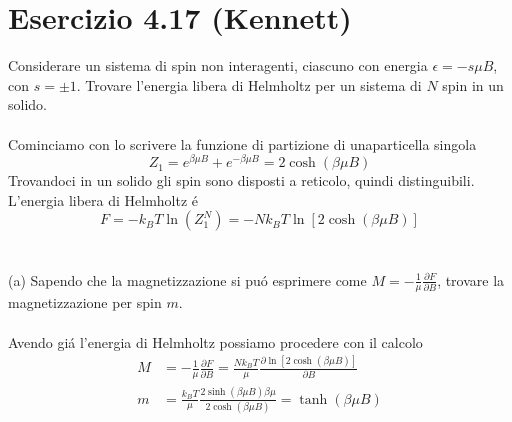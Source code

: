 \documentclass[a4paper]{article}
\begin{document}
    \section*{Esercizio 4.17 (Kennett)}
        Considerare un sistema di spin non interagenti, ciascuno con energia $\epsilon=-s\mu B$, con $s=\pm 1$.
        Trovare l'energia libera di Helmholtz per un sistema di $N$ spin in un solido.
        \\
        \\
        Cominciamo con lo scrivere la funzione di partizione di unaparticella singola
        \begin{equation*}
            Z_1=e^{\beta\mu B}+e^{-\beta\mu B}=2\cosh(\beta\mu B)
        \end{equation*}
        Trovandoci in un solido gli spin sono disposti a reticolo, quindi distinguibili.
        L'energia libera di Helmholtz \'e
        \begin{equation*}
            F=-k_BT\ln(Z_1^N)=-Nk_BT\ln[2\cosh(\beta\mu B)]
        \end{equation*}
        \\
        \\
        (a) Sapendo che la magnetizzazione si pu\'o esprimere come $M=-\frac{1}{\mu}\frac{\partial F}{\partial B}$, trovare la magnetizzazione per spin $m$.
        \\
        \\
        Avendo gi\'a l'energia di Helmholtz possiamo procedere con il calcolo
        \begin{equation*}
            \begin{split}
                M&=-\frac{1}{\mu}\frac{\partial F}{\partial B}=\frac{Nk_BT}{\mu}\frac{\partial\ln[2\cosh(\beta\mu B)]}{\partial B}\\
                m&=\frac{k_BT}{\mu}\frac{2\sinh(\beta\mu B)\beta\mu}{2\cosh(\beta\mu B)}=\tanh(\beta\mu B)
            \end{split}
        \end{equation*}
        \begin{center}
        \end{center}
\end{document}
